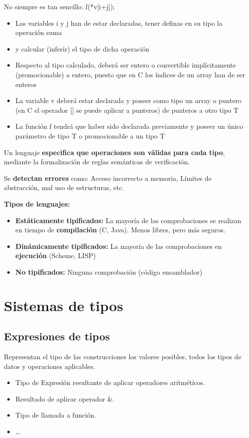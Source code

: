 \documentclass[12pt, twoside, openright]{report} %
\begin{document}
No siempre es tan sencillo: f(*v[i+j]);
\begin{itemize}
  \item Las variables i y j han de estar declaradas, tener definas en su tipo
la operación suma
  \item y calcular (inferir) el tipo de dicha operación
  \item Respecto al tipo calculado, deberá ser entero o convertible
implícitamente (promocionable) a entero, puesto que en C los
índices de un array han de ser enteros
  \item La variable v deberá estar declarada y poseer como tipo un array o
puntero (en C el operador [] se puede aplicar a punteros) de
punteros a otro tipo T
  \item La función f tendrá que haber sido declarada previamente y poseer
un único parámetro de tipo T o promocionable a un tipo T
\end{itemize}

Un lenguaje \textbf{especifica que operaciones son válidas para cada tipo}, mediante la formalización de reglas semánticas de verificación.

Se \textbf{detectan errores} como: Acceso incorrecto a memoria, Límites de abstracción, mal uso de estructuras, etc.

\textbf{Tipos de lenguajes:}
\begin{itemize}
  \item \textbf{Estáticamente tipificados:} La mayoría de las comprobaciones se realizan en tiempo de \textbf{compilación} (C, Java). Menos libres, pero más seguros.
  \item \textbf{Dinámicamente tipificados:} La mayoría de las comprobaciones en \textbf{ejecución} (Scheme, LISP)
  \item \textbf{No tipificados:} Ninguna comprobación (código ensamblador)
\end{itemize}

\section{Sistemas de tipos}
\subsection{Expresiones de tipos}
Representan el tipo de las construcciones los valores posibles, todos los tipos de datos y operaciones aplicables.
\begin{itemize}
  \item Tipo de Expresión resultante de aplicar operadores aritméticos.
  \item Resultado de aplicar operador \&.
  \item Tipo de llamada a función.
  \item …
\end{itemize}
\end{document}
